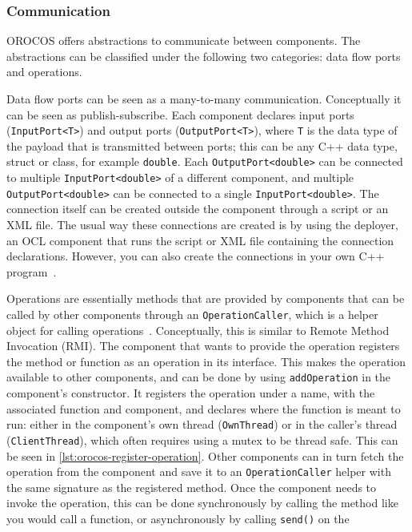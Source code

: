 \documentclass[a4paper]{book}
\begin{document}
\subsubsection{Communication}
OROCOS offers abstractions to communicate between components. The abstractions
can be classified under the following two categories: data flow ports and
operations.
\par
Data flow ports can be seen as a many-to-many communication. Conceptually it can
be seen as publish-subscribe. Each component declares input ports
(\texttt{InputPort<T>}) and output ports (\texttt{OutputPort<T>}), where
\texttt{T} is the data type of the payload that is transmitted between ports;
this can be any C++ data type, struct or class, for example \texttt{double}.
Each \texttt{OutputPort<double>} can be connected to multiple
\texttt{InputPort<double>} of a different component, and multiple
\texttt{OutputPort<double>} can be connected to a single
\texttt{InputPort<double>}. The connection itself can be created outside the
component through a script or an XML file. The usual way these connections are
created is by using the deployer, an OCL component that runs the script or XML
file containing the connection declarations. However, you can also create the
connections in your own C++ program~\cite{orocos_rtt_manual}.
\par
Operations are essentially methods that are provided by components that can be
called by other components through an \texttt{OperationCaller}, which is a
helper object for calling operations~\cite{orocos_rtt_manual}. Conceptually,
this is similar to Remote Method Invocation (RMI). The component that wants to
provide the operation registers the method or function as an operation in its
interface. This makes the operation available to other components, and can be
done by using \texttt{addOperation} in the component's constructor. It registers
the operation under a name, with the associated function and component, and
declares where the function is meant to run: either in the component's own
thread (\texttt{OwnThread}) or in the caller's thread (\texttt{ClientThread}),
which often requires using a mutex to be thread safe. This can be seen in
\cref{lst:orocos-register-operation}. Other components can in turn fetch the
operation from the component and save it to an \texttt{OperationCaller} helper
with the same signature as the registered method. Once the component needs to
invoke the operation, this can be done synchronously by calling the method like
you would call a function, or asynchronously by calling \texttt{send()} on the
\end{document}
